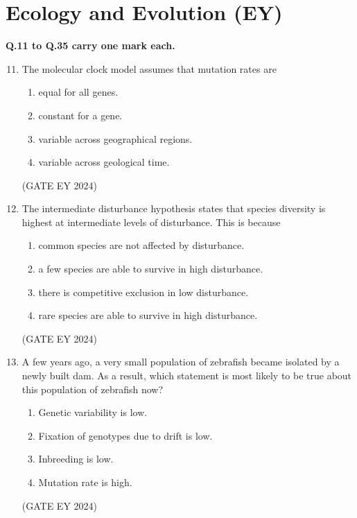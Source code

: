 \documentclass[journal]{IEEEtran}
\begin{document}
\section*{\textbf{Ecology and Evolution (EY)}}
\textbf{Q.11 to Q.35 carry one mark each.}
\begin{enumerate}
\setcounter{enumi}{10}

\item The molecular clock model assumes that mutation rates are
    \begin{multicols}{2}
    \begin{enumerate}
        \item equal for all genes.
        \item constant for a gene.
        \item variable across geographical regions.
        \item variable across geological time.
    \end{enumerate}
    \end{multicols}
\hfill{(GATE EY 2024)}

\item The intermediate disturbance hypothesis states that species diversity is highest at intermediate levels of disturbance. This is because
    \begin{enumerate}
        \item common species are not affected by disturbance.
        \item a few species are able to survive in high disturbance.
        \item there is competitive exclusion in low disturbance.
        \item rare species are able to survive in high disturbance.
    \end{enumerate}
\hfill{(GATE EY 2024)}

\item A few years ago, a very small population of zebrafish became isolated by a newly built dam. As a result, which statement is most likely to be true about this population of zebrafish now?
    \begin{enumerate}
        \item Genetic variability is low.
        \item Fixation of genotypes due to drift is low.
        \item Inbreeding is low.
        \item Mutation rate is high.
    \end{enumerate}
\hfill{(GATE EY 2024)}


\end{enumerate}
\end{document}
